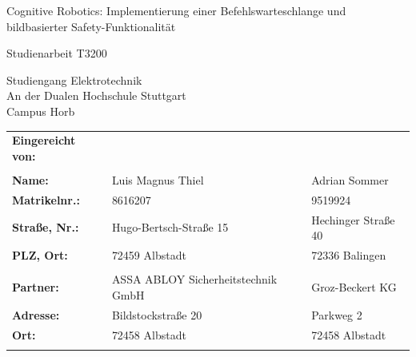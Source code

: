 \documentclass[12pt,a4paper]{report}
\newcommand{\art}{Studienarbeit T3200} %
\newcommand{\titel}{Cognitive Robotics: Implementierung einer Befehlswarteschlange und bildbasierter Safety-Funktionalität}
\newcommand{\untertitel}{}
\newcommand{\studienfach}{Elektrotechnik} %
\newcommand{\fachrichtung}{Elektronik}
\newcommand{\hochschule}{Dualen Hochschule Stuttgart} %
\newcommand{\campus}{Campus Horb}
\newcommand{\autor}{Luis Magnus Thiel}
\newcommand{\strassehausnr}{Hugo-Bertsch-Straße 15}
\newcommand{\plzwohnort}{72459 Albstadt}
\newcommand{\autorzwei}{Adrian Sommer}
\newcommand{\strassehausnrzwei}{Hechinger Straße 40}
\newcommand{\plzwohnortzwei}{72336 Balingen}
\newcommand{\matrikelnr}{8616207}
\newcommand{\matrikelnrzwei}{9519924}
\newcommand{\firma}{ASSA ABLOY Sicherheitstechnik GmbH}
\newcommand{\firmenstrasse}{Bildstockstraße 20}
\newcommand{\firmenort}{72458 Albstadt}
\newcommand{\firmazwei}{Groz-Beckert KG}
\newcommand{\firmenstrassezwei}{Parkweg 2}
\newcommand{\firmenortzwei}{72458 Albstadt}
\begin{document}
\begin{titlepage}
	
	\thispagestyle{plain}
	\renewcommand*{\pagemark}{} %
	\ifoot*{}
	\vspace{-10pt}
	\begin{center}
		
		\begin{LARGE}
			\titel
			\\		
			\vspace{14pt}
		\end{LARGE}
		\begin{LARGE}
			\art\\
			\vspace{16pt}
		\end{LARGE}
		\begin{LARGE}
			\untertitel	
		\end{LARGE}
	\end{center}
	
	\begin{center}
		Studiengang \studienfach\\
		
		An der \hochschule \\ \campus\\
	\end{center}
	
	\let\stretchbuffer\arraystretch %
	\renewcommand{\arraystretch}{1.25} %
	\begin{table}[b!]
		\normalsize
		\begin{tabularx}{\textwidth}{lXX} %
			\multicolumn{1}{l}{\textbf{Eingereicht von:}} & \multicolumn{2}{l}{} \\
			\\[-0.5em] 
			
			\textbf{Name:} 			& \autor 				& \autorzwei \\
			\textbf{Matrikelnr.:} 	& \matrikelnr 			& \matrikelnrzwei \\
			\textbf{Straße, Nr.:} 	& \strassehausnr 		& \strassehausnrzwei \\
			\textbf{PLZ, Ort:} 		& \plzwohnort 			& \plzwohnortzwei \\
			\\[1cm]
			\textbf{Partner:} 	    & \firma 				& \firmazwei \\
			\textbf{Adresse:} 	    & \firmenstrasse 		& \firmenstrassezwei \\
			\textbf{Ort:} 	        & \firmenort 			& \firmenortzwei \\
			\\[1cm]
			

\end{tabularx}
\end{table}
\end{titlepage}
\end{document}
